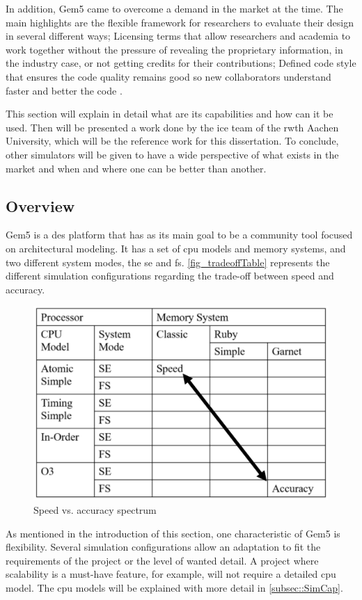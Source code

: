 In addition, Gem5 came to overcome a demand in the market at the time. The main highlights are the flexible framework for researchers to 
evaluate their design in several different ways; Licensing terms that allow researchers and academia to work together without the pressure 
of revealing the proprietary information, in the industry case, or not getting credits for their contributions; Defined code style that ensures 
the code quality remains good so new collaborators understand faster and better the code \cite{TheGem5Simulator}. 

This section will explain in detail what are its capabilities and how can it be used. Then will be presented a work done by the \gls{ice} team 
of the \gls{rwth} Aachen University, which will be the reference work for this dissertation. To conclude, other simulators will be given to 
have a wide perspective of what exists in the market and when and where one can be better than another. 

\subsection{Overview}

Gem5 is a \gls{des} platform that has as its main goal to be a community tool focused on architectural modeling. It has a set of \gls{cpu} 
models and memory systems, and two different system modes, the \gls{se} and \gls{fs}. \autoref{fig_tradeoffTable} represents the different 
simulation configurations regarding the trade-off between speed and accuracy. 

\begin{figure}[H]
	\centering
 	\includegraphics[width=0.6\linewidth]{Images/tradeoffTable.png}
 	\caption{Speed vs. accuracy spectrum \cite{TheGem5Simulator}}
	 \label{fig_tradeoffTable}
\end{figure}

As mentioned in the introduction of this section, one characteristic of Gem5 is flexibility. Several simulation configurations allow an 
adaptation to fit the requirements of the project or the level of wanted detail. A project where scalability is a must-have feature, for 
example, will not require a detailed \gls{cpu} model. The \gls{cpu} models will be explained with more detail in \autoref{subsec::SimCap}. 

